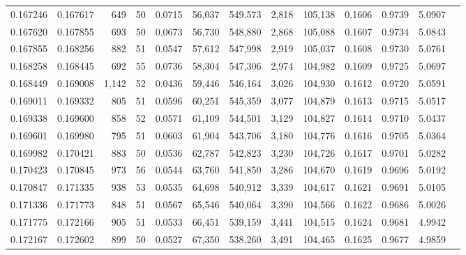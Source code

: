 \begin{tabular}{rrrrrrrrrrrrr}
0.167246 & 0.167617 &   649 &  50 &                                     0.0715 &  56,037 & 549,573 &   2,818 & 105,138 & 0.1606 & 0.9739 & 5.0907 \\
0.167620 & 0.167855 &   693 &  50 &                                     0.0673 &  56,730 & 548,880 &   2,868 & 105,088 & 0.1607 & 0.9734 & 5.0843 \\
0.167855 & 0.168256 &   882 &  51 &                                     0.0547 &  57,612 & 547,998 &   2,919 & 105,037 & 0.1608 & 0.9730 & 5.0761 \\
0.168258 & 0.168445 &   692 &  55 &                                     0.0736 &  58,304 & 547,306 &   2,974 & 104,982 & 0.1609 & 0.9725 & 5.0697 \\
0.168449 & 0.169008 & 1,142 &  52 &                                     0.0436 &  59,446 & 546,164 &   3,026 & 104,930 & 0.1612 & 0.9720 & 5.0591 \\
0.169011 & 0.169332 &   805 &  51 &                                     0.0596 &  60,251 & 545,359 &   3,077 & 104,879 & 0.1613 & 0.9715 & 5.0517 \\
0.169338 & 0.169600 &   858 &  52 &                                     0.0571 &  61,109 & 544,501 &   3,129 & 104,827 & 0.1614 & 0.9710 & 5.0437 \\
0.169601 & 0.169980 &   795 &  51 &                                     0.0603 &  61,904 & 543,706 &   3,180 & 104,776 & 0.1616 & 0.9705 & 5.0364 \\
0.169982 & 0.170421 &   883 &  50 &                                     0.0536 &  62,787 & 542,823 &   3,230 & 104,726 & 0.1617 & 0.9701 & 5.0282 \\
0.170423 & 0.170845 &   973 &  56 &                                     0.0544 &  63,760 & 541,850 &   3,286 & 104,670 & 0.1619 & 0.9696 & 5.0192 \\
0.170847 & 0.171335 &   938 &  53 &                                     0.0535 &  64,698 & 540,912 &   3,339 & 104,617 & 0.1621 & 0.9691 & 5.0105 \\
0.171336 & 0.171773 &   848 &  51 &                                     0.0567 &  65,546 & 540,064 &   3,390 & 104,566 & 0.1622 & 0.9686 & 5.0026 \\
0.171775 & 0.172166 &   905 &  51 &                                     0.0533 &  66,451 & 539,159 &   3,441 & 104,515 & 0.1624 & 0.9681 & 4.9942 \\
0.172167 & 0.172602 &   899 &  50 &                                     0.0527 &  67,350 & 538,260 &   3,491 & 104,465 & 0.1625 & 0.9677 & 4.9859 \\

\end{tabular}
